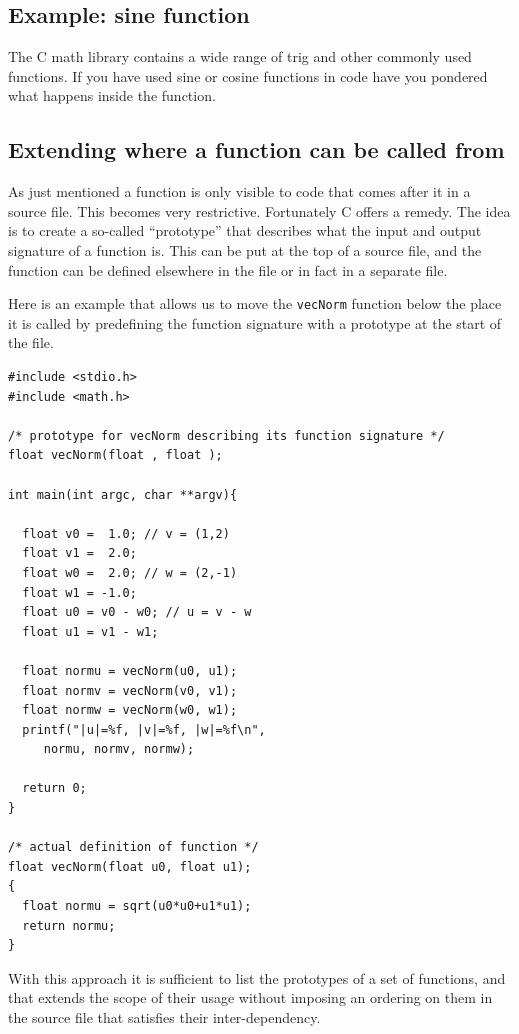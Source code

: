 \subsection{Example: sine function}

The C math library contains a wide range of trig and other commonly used functions. If you have used sine or cosine functions in code have you pondered what happens inside the function.

\subsection{Extending where a function can be called from} 
As just mentioned a function is only visible to code that comes after it in a source file. This becomes very restrictive. Fortunately C offers a remedy. The idea is to create a so-called ``prototype'' that describes what the input and output signature of a function is. This can be put at the top of a source file, and the function can be defined elsewhere in the file or in fact in a separate file.

Here is an example that allows us to move the \texttt{vecNorm} function below the place it is called by predefining the function signature with a prototype at the start of the file.

\begin{verbatim}
#include <stdio.h>
#include <math.h>

/* prototype for vecNorm describing its function signature */
float vecNorm(float , float );

int main(int argc, char **argv){

  float v0 =  1.0; // v = (1,2)                                                 
  float v1 =  2.0;
  float w0 =  2.0; // w = (2,-1)                                                
  float w1 = -1.0;
  float u0 = v0 - w0; // u = v - w                                              
  float u1 = v1 - w1;

  float normu = vecNorm(u0, u1);
  float normv = vecNorm(v0, v1);
  float normw = vecNorm(w0, w1);
  printf("|u|=%f, |v|=%f, |w|=%f\n", 
     normu, normv, normw);

  return 0;
}

/* actual definition of function */
float vecNorm(float u0, float u1);
{
  float normu = sqrt(u0*u0+u1*u1);
  return normu;
}
\end{verbatim}

With this approach it is sufficient to list the prototypes of a set of functions, and that extends the scope of their usage without imposing an ordering on them in the source file that satisfies their inter-dependency. 

